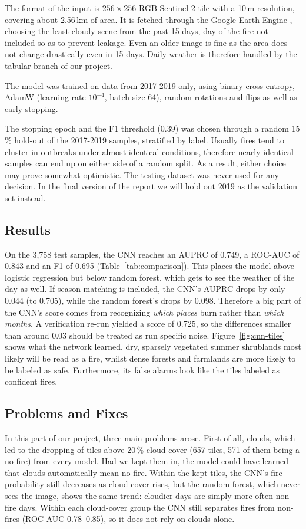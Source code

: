 The format of the input is $256\times256$ RGB Sentinel-2 tile \cite{drusch2012sentinel2} with a 10\,m resolution, covering about 2.56\,km of area. It is fetched through the Google Earth Engine \cite{gorelick2017gee}, choosing the least cloudy scene from the past 15-days, day of the fire not included so as to prevent leakage. Even an older image is fine as the area does not change drastically even in 15 days. Daily weather is therefore handled by the tabular branch of our project. 


The model was trained on data from 2017-2019 only, using binary cross entropy, AdamW (learning rate $10^{-4}$, batch size 64), random rotations and flips as well as early-stopping. 


 The stopping epoch and the F1 threshold (0.39) was chosen through a random 15\,\% hold-out of the 2017-2019 samples, stratified by label. Usually fires tend to cluster in outbreaks under almost identical conditions, therefore nearly identical samples can end up on either side of a random split. As a result, either choice may prove somewhat optimistic. The testing dataset was never used for any decision. In the final version of the report we will hold out 2019 as the validation set instead. 

\subsection{Results}
On the 3{,}758 test samples, the CNN reaches an AUPRC of 0.749, a ROC-AUC of 0.843 and an F1 of 0.695 (Table~\ref{tab:comparison}). This places the model above logistic regression but below random forest, which gets to see the weather of the day as well. If season matching is included, the CNN's AUPRC drops by only 0.044 (to 0.705), while the random forest's drops by 0.098. Therefore a big part of the CNN's score comes from recognizing \emph{which places} burn rather than \emph{which months}. A verification re-run yielded a score of 0.725, so the differences smaller than around 0.03 should be treated as run specific noise. Figure~\ref{fig:cnn-tiles} shows what the network learned, dry, sparsely vegetated summer shrublands most likely will be read as a fire, whilst dense forests and farmlands are more likely to be labeled as safe. Furthermore, its false alarms look like the tiles labeled as confident fires. 

\subsection{Problems and Fixes} 
In this part of our project, three main problems arose. First of all, clouds, which led to the dropping of tiles above 20\,\% cloud cover (657 tiles, 571 of them being a no-fire) from every model. Had we kept them in, the model could have learned that clouds automatically mean no fire. Within the kept tiles, the CNN's fire probability still decreases as cloud cover rises, but the random forest, which never sees the image, shows the same trend: cloudier days are simply more often non-fire days. Within each cloud-cover group the CNN still separates fires from non-fires (ROC-AUC 0.78–0.85), so it does not rely on clouds alone.


